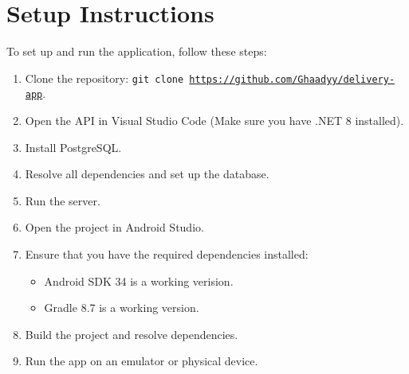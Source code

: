 \documentclass{article}
\begin{document}
\section*{Setup Instructions}
To set up and run the application, follow these steps:
\begin{enumerate}
    \item Clone the repository: \texttt{git clone \href{https://github.com/Ghaadyy/delivery-app}{https://github.com/Ghaadyy/delivery-app}}.
    \item Open the API in Visual Studio Code (Make sure you have .NET 8 installed).
    \item Install PostgreSQL.
    \item Resolve all dependencies and set up the database.
    \item Run the server.
    \item Open the project in Android Studio.
    \item Ensure that you have the required dependencies installed: \begin{itemize}
              \item Android SDK 34 is a working verision.
              \item Gradle 8.7 is a working version.
          \end{itemize}
    \item Build the project and resolve dependencies.
    \item Run the app on an emulator or physical device.
\end{enumerate}
\end{document}
